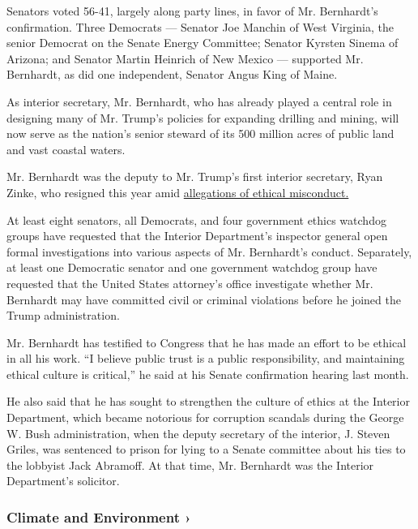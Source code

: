 Senators voted 56-41, largely along party lines, in favor of Mr.
Bernhardt's confirmation. Three Democrats --- Senator Joe Manchin of
West Virginia, the senior Democrat on the Senate Energy Committee;
Senator Kyrsten Sinema of Arizona; and Senator Martin Heinrich of New
Mexico --- supported Mr. Bernhardt, as did one independent, Senator
Angus King of Maine.

As interior secretary, Mr. Bernhardt, who has already played a central
role in designing many of Mr. Trump's policies for expanding drilling
and mining, will now serve as the nation's senior steward of its 500
million acres of public land and vast coastal waters.

Mr. Bernhardt was the deputy to Mr. Trump's first interior secretary,
Ryan Zinke, who resigned this year amid
\href{https://www.nytimes.com/2018/12/15/us/ryan-zinke-interior-secretary.html?module=inline}{allegations
of ethical misconduct.}

At least eight senators, all Democrats, and four government ethics
watchdog groups have requested that the Interior Department's inspector
general open formal investigations into various aspects of Mr.
Bernhardt's conduct. Separately, at least one Democratic senator and one
government watchdog group have requested that the United States
attorney's office investigate whether Mr. Bernhardt may have committed
civil or criminal violations before he joined the Trump administration.

Mr. Bernhardt has testified to Congress that he has made an effort to be
ethical in all his work. ``I believe public trust is a public
responsibility, and maintaining ethical culture is critical,'' he said
at his Senate confirmation hearing last month.

He also said that he has sought to strengthen the culture of ethics at
the Interior Department, which became notorious for corruption scandals
during the George W. Bush administration, when the deputy secretary of
the interior, J. Steven Griles, was sentenced to prison for lying to a
Senate committee about his ties to the lobbyist Jack Abramoff. At that
time, Mr. Bernhardt was the Interior Department's solicitor.

\href{https://www.nytimes.com/section/climate?action=click\&pgtype=Article\&state=default\&region=MAIN_CONTENT_1\&context=storylines_keepup}{}

\hypertarget{climate-and-environment-}{%
\subsubsection{Climate and Environment
›}\label{climate-and-environment-}}

